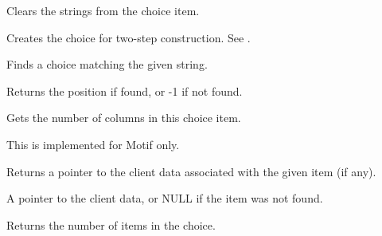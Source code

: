 Clears the strings from the choice item.

\label{wxchoicecreate}


Creates the choice for two-step construction. See .

\label{wxchoicefindstring}


Finds a choice matching the given string.




Returns the position if found, or -1 if not found.

\label{wxchoicegetcolumns}


Gets the number of columns in this choice item.


This is implemented for Motif only.

\label{wxchoicegetclientdata}


Returns a pointer to the client data associated with the given item (if any).




A pointer to the client data, or NULL if the item was not found.

\label{wxchoicegetcount}


Returns the number of items in the choice.

\label{wxchoicegetselection}

